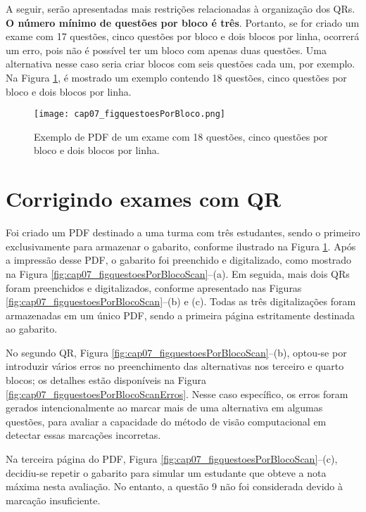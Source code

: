 A seguir, serão apresentadas mais restrições relacionadas à organização dos QRs. \textbf{O número mínimo de questões por bloco é três}. Portanto, se for criado um exame com 17 questões, cinco questões por bloco e dois blocos por linha, ocorrerá um erro, pois não é possível ter um bloco com apenas duas questões. Uma alternativa nesse caso seria criar blocos com seis questões cada um, por exemplo. Na Figura \ref{fig:cap07_figquestoesPorBloco}, é mostrado um exemplo contendo 18 questões, cinco questões por bloco e dois blocos por linha.



\begin{figure}[htbp]
\centering
\texttt{[image: cap07\_figquestoesPorBloco.png]}
\caption{Exemplo de PDF de um exame com 18 questões, cinco questões por bloco e dois blocos por linha.}
\label{fig:cap07_figquestoesPorBloco}
\end{figure}

\section{Corrigindo exames com QR}\label{sec:examesCorrigirQR}

Foi criado um PDF destinado a uma turma com três estudantes, sendo o primeiro exclusivamente para armazenar o gabarito, conforme ilustrado na Figura \ref{fig:cap07_figquestoesPorBloco}. Após a impressão desse PDF, o gabarito foi preenchido e digitalizado, como mostrado na Figura \ref{fig:cap07_figquestoesPorBlocoScan}--(a). Em seguida, mais dois QRs foram preenchidos e digitalizados, conforme apresentado nas Figuras \ref{fig:cap07_figquestoesPorBlocoScan}--(b) e (c). Todas as três digitalizações foram armazenadas em um único PDF, sendo a primeira página estritamente destinada ao gabarito.

No segundo QR, Figura \ref{fig:cap07_figquestoesPorBlocoScan}--(b), optou-se por introduzir vários erros no preenchimento das alternativas nos terceiro e quarto blocos; os detalhes estão disponíveis na Figura \ref{fig:cap07_figquestoesPorBlocoScanErros}. Nesse caso específico, os erros foram gerados intencionalmente ao marcar mais de uma alternativa em algumas questões, para avaliar a capacidade do método de visão computacional em detectar essas marcações incorretas. 

Na terceira página do PDF, Figura \ref{fig:cap07_figquestoesPorBlocoScan}--(c), decidiu-se repetir o gabarito para simular um estudante que obteve a nota máxima nesta avaliação. No entanto, a questão 9 não foi considerada devido à marcação insuficiente. 

